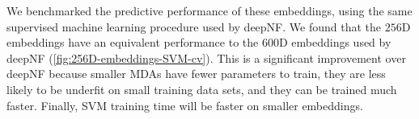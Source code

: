 We benchmarked the predictive performance of these embeddings, using the same supervised machine learning procedure used by deepNF.
We found that the $256$D embeddings have an equivalent performance to the $600$D embeddings used by deepNF (\ref{fig:256D-embeddings-SVM-cv}).
This is a significant improvement over deepNF because smaller MDAs have fewer parameters to train,
they are less likely to be underfit on small training data sets,
and they can be trained much faster.
Finally, SVM training time will be faster on smaller embeddings.





%

